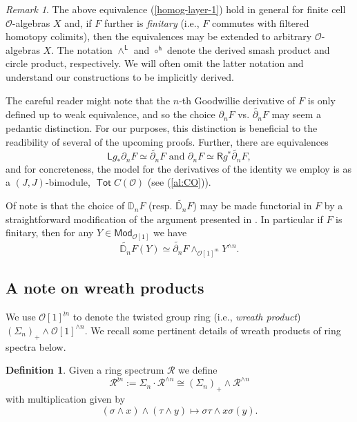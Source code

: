 \documentclass[11pt]{amsart}
\theoremstyle{definition}
\newtheorem{definition}[subsection]{Definition}
\theoremstyle{remark}
\newtheorem{remark}[subsection]{Remark}
\newcommand{\Tot}{\operatorname{\mathsf{Tot}}}
\newcommand{\Cal}[1]{\mathcal{#1}}
\begin{document}
\begin{remark} 
    The above equivalence (\ref{homog-layer-1}) hold in general for finite cell $\Cal{O}$-algebras $X$ and, if $F$ further is \textit{finitary} (i.e., $F$ commutes with filtered homotopy colimits), then the equivalences may be extended to arbitrary $\Cal{O}$-algebras $X$. The notation $\wedge^{\mathsf{L}}$ and $\circ^{\mathsf{h}}$ denote the derived smash product and circle product, respectively. We will often omit the latter notation and understand our constructions to be implicitly derived.\end{remark}

    The careful reader might note that the $n$-th Goodwillie derivative of $F$ is only defined up to weak equivalence, and so the choice $\partial_n F$ vs. $\widetilde{\partial_n}F$ may seem a pedantic distinction. For our purposes, this distinction is beneficial to the readibility of several of the upcoming proofs. Further, there are equivalences \[ \mathsf{L} g_* \partial_n F \simeq \widetilde{\partial_n} F \text{ and } \partial_n F \simeq \mathsf{R} g^* \widetilde{\partial_n}F, \] and for concreteness, the model for the derivatives of the identity we employ is as a $(J,J)$-bimodule, $\Tot C(\Cal{O})$ (see (\ref{al:CO})).
    

    Of note is that the choice of $\mathbb{D}_nF$ (resp. $\widetilde{\mathbb{D}_n}F$) may be made functorial in $F$ by a straightforward modification of the argument presented in \cite[2.7]{AC-1}. In particular if $F$ is finitary, then for any $Y\in \mathsf{Mod}_{\Cal{O}[1]}$ we have \begin{equation} \label{eq:D_nF(Y)} \widetilde{\mathbb{D}_n} F(Y)\simeq \widetilde{\partial_n} F\wedge_{\Cal{O}[1]^{\wr n}} Y^{\wedge n}.\end{equation}


\subsection{A note on wreath products}
We use $\Cal{O}[1]^{\wr n}$ to denote the twisted group ring (i.e., \textit{wreath product}) $(\Sigma_n)_+\wedge \Cal{O}[1]^{\wedge n}$. We recall some pertinent details of wreath products of ring spectra below.

\begin{definition} \label{rem:wreath-products}
    Given a ring spectrum $\Cal{R}$ we define \[
        \Cal{R}^{\wr n}:= \Sigma_n {\cdot} \Cal{R}^{\wedge n}\cong (\Sigma_n)_+\wedge \Cal{R}^{\wedge n}\]
    with multiplication given by \[(\sigma \wedge x) \wedge (\tau \wedge y)\mapsto \sigma\tau \wedge x\sigma(y).\] 
\end{definition}
\end{document}
